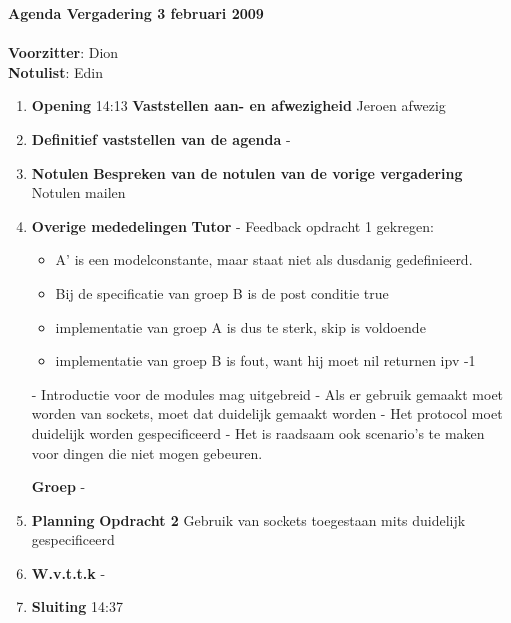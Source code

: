 \documentclass[11pt,oneside,a4paper]{article}
\begin{document}
\textbf{{\LARGE{Agenda Vergadering 3 februari 2009}}}\\ \\
\textbf{Voorzitter}: Dion\\
\textbf{Notulist}: Edin\\
\begin{enumerate}
    \item \textbf{Opening} 14:13
        \subitem \textbf{Vaststellen aan- en afwezigheid}
            \subsubitem Jeroen afwezig
    \item \textbf{Definitief vaststellen van de agenda}
        \subsubitem -
    \item \textbf{Notulen}
        \subitem \textbf{Bespreken van de notulen van de vorige vergadering}
            \subsubitem Notulen mailen
    \item \textbf{Overige mededelingen}
        \subitem \textbf{Tutor}
            \subsubitem - Feedback opdracht 1 gekregen:
              \begin{itemize}
                \item A' is een modelconstante, maar staat niet als dusdanig gedefinieerd.
                \item Bij de specificatie van groep B is de post conditie true
                \item implementatie van groep A is dus te sterk, skip is voldoende
                \item implementatie van groep B is fout, want hij moet nil returnen ipv -1
              \end{itemize}
            \subsubitem - Introductie voor de modules mag uitgebreid
            \subsubitem - Als er gebruik gemaakt moet worden van sockets, moet dat duidelijk gemaakt worden
            \subsubitem - Het protocol moet duidelijk worden gespecificeerd
            \subsubitem - Het is raadsaam ook scenario's te maken voor dingen die niet mogen gebeuren.
              
        \subitem \textbf{Groep}
            \subsubitem -
    \item \textbf{Planning}
        \subitem \textbf{Opdracht 2}
        \subsubitem Gebruik van sockets toegestaan mits duidelijk gespecificeerd
    \item \textbf{W.v.t.t.k}
        \subitem -
    \item \textbf{Sluiting} 14:37
\end{enumerate}
\end{document}
